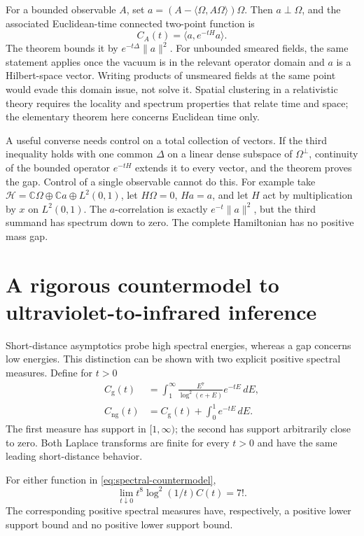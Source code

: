 For a bounded observable $A$, set
$a=(A-\langle\Omega,A\Omega\rangle)\Omega$.
Then $a\perp\Omega$, and the associated Euclidean-time connected
two-point function is
\[
 C_A(t)=\langle a,e^{-tH}a\rangle.
\]
The theorem bounds it by $e^{-t\Delta}\|a\|^2$.
For unbounded smeared fields, the same statement applies once the vacuum
is in the relevant operator domain and $a$ is a Hilbert-space vector.
Writing products of unsmeared fields at the same point would evade this
domain issue, not solve it.  Spatial clustering in a relativistic theory
requires the locality and spectrum properties that relate time and space;
the elementary theorem here concerns Euclidean time only.

A useful converse needs control on a total collection of vectors.  If the
third inequality holds with one common $\Delta$ on a linear dense
subspace of $\Omega^\perp$, continuity of the bounded operator
$e^{-tH}$ extends it to every vector, and the theorem proves the gap.
Control of a single observable cannot do this.  For example take
$\mathcal H=\mathbb C\Omega\oplus\mathbb C a\oplus L^2(0,1)$,
let $H\Omega=0$, $Ha=a$, and let $H$ act by multiplication by
$x$ on $L^2(0,1)$.  The $a$-correlation is exactly
$e^{-t}\|a\|^2$, but the third summand has spectrum down to zero.
The complete Hamiltonian has no positive mass gap.

\section{A rigorous countermodel to ultraviolet-to-infrared inference}

Short-distance asymptotics probe high spectral energies, whereas a gap
concerns low energies.  This distinction can be shown with two explicit
positive spectral measures.  Define for $t>0$
\begin{align}
 C_{\mathrm{g}}(t)&=\int_1^\infty
       \frac{E^7}{\log^2(e+E)}e^{-tE}\,dE,\\
 C_{\mathrm{ng}}(t)&=C_{\mathrm{g}}(t)+\int_0^1e^{-tE}\,dE.
 \label{eq:spectral-countermodel}
\end{align}
The first measure has support in $[1,\infty)$; the second has support
arbitrarily close to zero.  Both Laplace transforms are finite for every
$t>0$ and have the same leading short-distance behavior.

\begin{proposition}
For either function in \eqref{eq:spectral-countermodel},
\[
 \lim_{t\downarrow0}t^8\log^2(1/t)C(t)=7!.
\]
The corresponding positive spectral measures have, respectively, a positive
lower support bound and no positive lower support bound.
\end{proposition}

